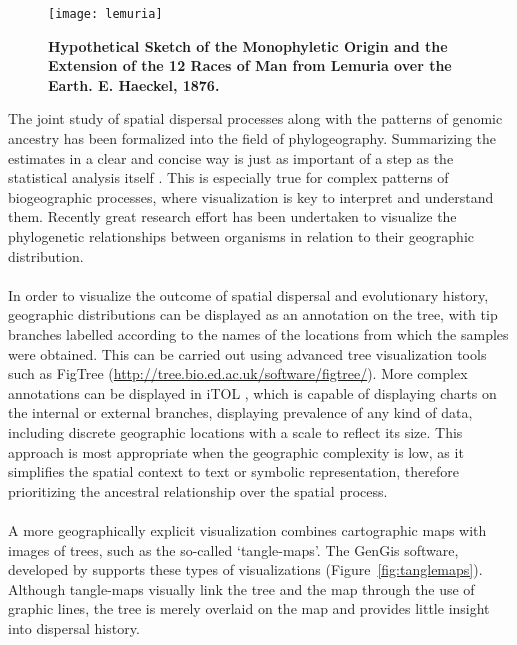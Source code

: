 \begin{figure}[h!]
\centering
\texttt{[image: lemuria]}
\caption{
{ \footnotesize 
{\bf Hypothetical Sketch of the Monophyletic Origin and the Extension of the 12 Races of Man from Lemuria over the Earth. E. Haeckel, 1876.} 
} %
}
\label{fig:lemuria}
\end{figure}


The joint study of spatial dispersal processes along with the patterns of genomic ancestry has been formalized into the field of phylogeography.
Summarizing the estimates in a clear and concise way is just as important of a step as the statistical analysis itself \citep{Hadley2010}.
This is especially true for complex patterns of biogeographic processes, where visualization is key to interpret and understand them. 
Recently great research effort has been undertaken to visualize the phylogenetic relationships between organisms in relation to their geographic distribution. 

\paragraph{}
In order to visualize the outcome of spatial dispersal and evolutionary history, geographic distributions can be displayed as an annotation on the tree, with tip branches labelled according to the names of the locations from which the samples were obtained.
This can be carried out using advanced tree visualization tools such as FigTree (\url{http://tree.bio.ed.ac.uk/software/figtree/}).
More complex annotations can be displayed in iTOL \citep{itol}, which is capable of displaying charts on the internal or external branches, displaying prevalence of any kind of data, including discrete geographic locations with a scale to reflect its size.
This approach is most appropriate when the geographic complexity is low, as it simplifies the spatial context to text or symbolic representation, therefore prioritizing the ancestral relationship over the spatial process.

\paragraph{}
A more geographically explicit visualization combines cartographic maps with images of trees, such as the so-called `tangle-maps'.
The GenGis software, developed by \cite{Parks2009} supports these types of visualizations (Figure~\ref{fig:tanglemaps}).
Although tangle-maps visually link the tree and the map through the use of graphic lines, the tree is merely overlaid on the map and provides little insight into dispersal history.

